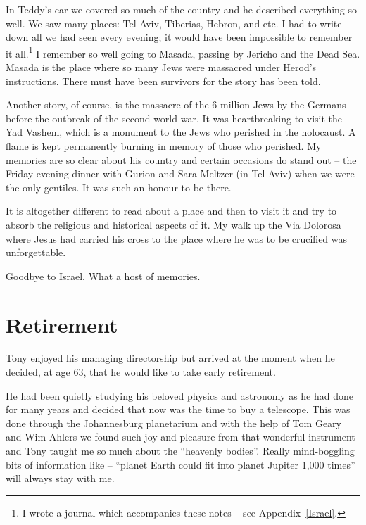 In Teddy's car we covered so much of the country and he described
everything so well. We saw many places: Tel Aviv, Tiberias, Hebron,
and etc. I had to write down all we had seen every evening; it would
have been impossible to remember it all.\footnote{I wrote a journal
  which accompanies these notes -- see Appendix~\ref{Israel}.} I
remember so well going to Masada, passing by Jericho and the Dead
Sea. Masada is the place where so many Jews were massacred under
Herod's instructions. There must have been survivors for the story has
been told.

Another story, of course, is the massacre of the 6 million Jews by the
Germans before the outbreak of the second world war. It was
heartbreaking to visit the Yad Vashem, which is a monument to the Jews
who perished in the holocaust. A flame is kept permanently burning in
memory of those who perished. My memories are so clear about his
country and certain occasions do stand out -- the Friday evening
dinner with Gurion and Sara Meltzer (in Tel Aviv) when we were the
only gentiles. It was such an honour to be there.

It is altogether different to read about a place and then to visit it
and try to absorb the religious and historical aspects of it. My walk
up the Via Dolorosa where Jesus had carried his cross to the place
where he was to be crucified was unforgettable.

Goodbye to Israel. What a host of memories.

\clearpage
\thispagestyle{empty}


\chapter{Retirement}

Tony enjoyed his managing directorship but arrived at the moment when
he decided, at age 63, that he would like to take early retirement.

He had been quietly studying his beloved physics and astronomy as he
had done for many years and decided that now was the time to buy a
telescope. This was done through the Johannesburg planetarium and with
the help of Tom Geary and Wim Ahlers we found such joy and pleasure
from that wonderful instrument and Tony taught me so much about the
``heavenly bodies''. Really mind-boggling bits of information like --
``planet Earth could fit into planet Jupiter 1,000 times'' will always
stay with me.

